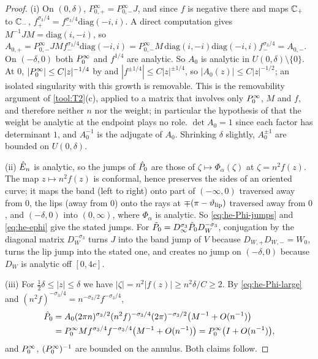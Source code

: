 \begin{proof}
(i) On $(0,\delta)$, $P^\infty_{0,+}=P^\infty_{0,-}J$, and since $f$ is negative there and maps $\mathbb{C}_+$ to $\mathbb{C}_-$,
$f_+^{\sigma_3/4}=f_-^{\sigma_3/4}\mathrm{diag}(-i,i)$. A direct computation gives $M^{-1}JM=\mathrm{diag}(i,-i)$, so
$A_{0,+}=P^\infty_{0,-}JMf_-^{\sigma_3/4}\mathrm{diag}(-i,i)=P^\infty_{0,-}M\,\mathrm{diag}(i,-i)\mathrm{diag}(-i,i)f_-^{\sigma_3/4}
=A_{0,-}$. On $(-\delta,0)$ both $P^\infty_0$ and $f^{1/4}$ are analytic. So $A_0$ is analytic in $U(0,\delta)\setminus\{0\}$.
At $0$, $|P^\infty_0|\le C|z|^{-1/4}$ by  and $|f^{\pm1/4}|\le C|z|^{\pm1/4}$, so $|A_0(z)|\le C|z|^{-1/2}$; an isolated
singularity with this growth is removable. This is the removability argument of \ref{tool:T2}(c), applied to a matrix
that involves only $P^\infty_0$, $M$ and $f$, and therefore neither $n$ nor the weight; in particular the hypothesis of
\cite{KMVV} that the weight be analytic at the endpoint plays no role. $\det A_0=1$ since each factor has determinant
$1$, and $A_0^{-1}$ is the adjugate of $A_0$. Shrinking $\delta$ slightly, $A_0^{\pm1}$ are bounded on $U(0,\delta)$.

(ii) $\hat E_n$ is analytic, so the jumps of $\hat P_0$ are those of $\zeta\mapsto\Phi_\alpha(\zeta)$ at $\zeta=n^2f(z)$. The
map $z\mapsto n^2f(z)$ is conformal, hence preserves the sides of an oriented curve; it maps the band (left to right)
onto part of $(-\infty,0)$ traversed away from $0$, the lips (away from $0$) onto the rays at $\mp(\pi-\vartheta_{\mathrm{lip}})$
traversed away from $0$, and $(-\delta,0)$ into $(0,\infty)$, where $\Phi_\alpha$ is analytic. So
\eqref{eq:he-Phi-jumps} and \eqref{eq:he-ephi} give the stated jumps. For $\tilde P_0=D_\infty^{\sigma_3}\hat P_0
D_W^{-\sigma_3}$, conjugation by the diagonal matrix $D_W^{-\sigma_3}$ turns $J$ into the band jump of $V$ because
$D_{W,+}D_{W,-}=W_0$, turns the lip jump into the stated one, and creates no jump on $(-\delta,0)$ because $D_W$ is
analytic off $[0,4c]$.

(iii) For $\frac12\delta\le|z|\le\delta$ we have $|\zeta|=n^2|f(z)|\ge n^2\delta/C\ge2$. By \eqref{eq:he-Phi-large} and
$(n^2f)^{-\sigma_3/4}=n^{-\sigma_3/2}f^{-\sigma_3/4}$,
\begin{align*}
  \hat P_0&=A_0(2\pi n)^{\sigma_3/2}(n^2f)^{-\sigma_3/4}(2\pi)^{-\sigma_3/2}\bigl(M^{-1}+O(n^{-1})\bigr)\\
  &=P^\infty_0 Mf^{\sigma_3/4}f^{-\sigma_3/4}\bigl(M^{-1}+O(n^{-1})\bigr)=P^\infty_0\bigl(I+O(n^{-1})\bigr),
\end{align*}
and $P^\infty_0$, $(P^\infty_0)^{-1}$ are bounded on the annulus. Both claims follow.
\end{proof}

